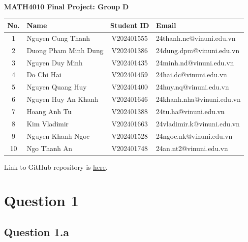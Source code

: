 \documentclass[a4paper,10pt]{article}
\theoremstyle{nonumberplain}
\theoremstyle{nonumberplain}
\theoremstyle{nonumberplain}
\theoremstyle{nonumberplain}
\begin{document}
\textbf{MATH4010 Final Project: Group D}
\vspace{-0.2cm} 
\begin{table}[H]
\centering
\begin{tabular}{|c|l|c|l|}
\hline
\textbf{No.} & \textbf{Name} & \textbf{Student ID} & \textbf{Email} \\ \hline
1 & Nguyen Cung Thanh & V202401555 & 24thanh.nc@vinuni.edu.vn \\ \hline
2 & Duong Pham Minh Dung & V202401386 & 24dung.dpm@vinuni.edu.vn \\ \hline
3 & Nguyen Duy Minh & V202401435 &  24minh.nd@vinuni.edu.vn\\ \hline
4 & Do Chi Hai & V202401459  & 24hai.dc@vinuni.edu.vn  \\ \hline
5 & Nguyen Quang Huy & V202401400 &  24huy.nq@vinuni.edu.vn \\ \hline
6 & Nguyen Huy An Khanh & V202401646 & 
24khanh.nha@vinuni.edu.vn \\ \hline 
7 & Hoang Anh Tu & V202401388 & 24tu.ha@vinuni.edu.vn \\ \hline
8 & Kim Vladimir& V202401663&  24vladimir.k@vinuni.edu.vn\\ \hline 
9 & Nguyen Khanh Ngoc & V202401528 & 24ngoc.nk@vinuni.edu.vn  \\ \hline
10 & Ngo Thanh An & V202401748 & 24an.nt2@vinuni.edu.vn \\ \hline
\end{tabular}
\end{table}
\vspace{-0.3cm} 
Link to GitHub repository is \href{https://github.com/duongphamminhdung/MATH4010_Final_Project}{here}.
\vspace{-0.3cm} 


\section{Question 1}
\subsection{Question 1.a}
\end{document}
